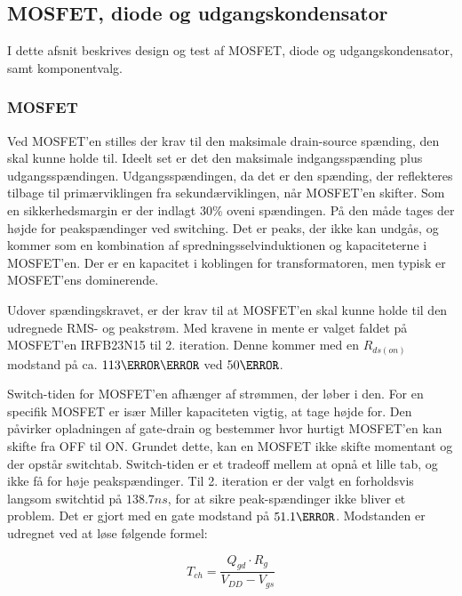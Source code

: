 \subsection{MOSFET, diode og udgangskondensator}
I dette afsnit beskrives design og test af MOSFET, diode og udgangskondensator, samt komponentvalg.

\subsubsection{MOSFET}
\noindent Ved MOSFET'en stilles der krav til den maksimale drain-source spænding, den skal kunne holde til. Ideelt set er det den maksimale indgangsspænding plus udgangsspændingen. Udgangsspændingen, da det er den spænding, der reflekteres tilbage til primærviklingen fra sekundærviklingen, når MOSFET'en skifter. Som en sikkerhedsmargin er der indlagt $30\percent$ oveni spændingen. På den måde tages der højde for peakspændinger ved switching. Det er peaks, der ikke kan undgås, og kommer som en kombination af spredningsselvinduktionen og kapaciteterne i MOSFET'en. Der er en kapacitet i koblingen for transformatoren, men typisk er MOSFET'ens dominerende. 


Udover spændingskravet, er der krav til at MOSFET'en skal kunne holde til den udregnede RMS- og peakstrøm. Med kravene in mente er valget faldet på MOSFET'en IRFB23N15\cite{IRFB23N15} til 2. iteration. Denne kommer med en $R_{ds(on)}$ modstand på ca. $113\milli \ohm$ ved $50\degreeCelsius$.

Switch-tiden for MOSFET'en afhænger af strømmen, der løber i den. For en specifik MOSFET er især Miller kapaciteten vigtig, at tage højde for. Den påvirker opladningen af gate-drain og bestemmer hvor hurtigt MOSFET'en kan skifte fra OFF til ON. Grundet dette, kan en MOSFET ikke skifte momentant og der opstår switchtab. Switch-tiden er et tradeoff mellem at opnå et lille tab, og ikke få for høje peakspændinger. Til 2. iteration er der valgt en forholdsvis langsom switchtid på $138.7ns$, for at sikre peak-spændinger ikke bliver et problem. Det er gjort med en gate modstand på $51.1\ohm$. Modstanden er udregnet ved at løse følgende formel:

\begin{equation} 
T_{ch} = \frac{Q_{gd}\cdot R_g}{V_{DD} - V_{gs}}
\end{equation}


